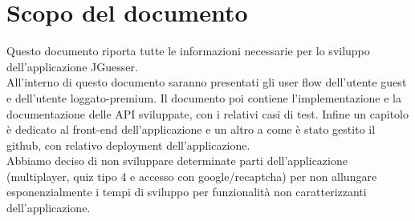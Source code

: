 \section*{Scopo del documento}
Questo documento riporta tutte le informazioni necessarie per lo sviluppo dell'applicazione JGuesser. \\
All'interno di questo documento saranno presentati gli user flow dell'utente guest e dell'utente loggato-premium. Il documento poi contiene l'implementazione e la documentazione delle API sviluppate, con i relativi casi di test. Infine un capitolo è dedicato al front-end dell'applicazione e un altro a come è stato gestito il github, con relativo deployment dell'applicazione. \\
Abbiamo deciso di non sviluppare determinate parti dell'applicazione (multiplayer, quiz tipo 4 e accesso con google/recaptcha) per non allungare esponenzialmente i tempi di sviluppo per funzionalità non caratterizzanti dell'applicazione. \\
